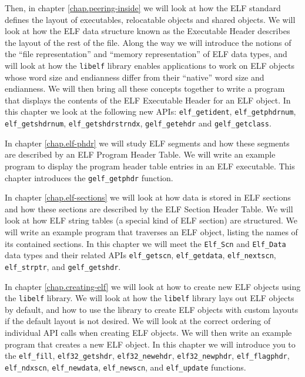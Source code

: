 \documentclass[a4paper,pdftex]{book}
\newcommand{\function}[1]{\texttt{#1}}
\newcommand{\library}[1]{\texttt{#1}}
\newcommand{\type}[1]{\texttt{#1}}
\begin{document}
Then, in chapter \vref{chap.peering-inside} we will look at how the
ELF standard defines the layout of executables, relocatable objects
and shared objects. We will look at how the ELF data structure known
as the Executable Header describes the layout
of the rest of the file.  Along the way we will introduce the notions
of the ``file representation'' and ``memory representation'' of ELF
data types, and will look at how the \library{libelf} library enables
applications to work on ELF objects whose word size and endianness
differ from their ``native'' word size and endianness. We will then
bring all these concepts together to write a program that displays the
contents of the ELF Executable Header for an ELF object. In this
chapter we look at the following new APIs: \function{elf\_getident},
\function{elf\_getphdrnum}, \function{elf\_getshdrnum},
\function{elf\_getshdrstrndx}, \function{gelf\_getehdr} and
\function{gelf\_getclass}.

In chapter \vref{chap.elf-phdr} we will study ELF segments and how
these segments are described by an ELF Prog\-ram Head\-er Table. We
will write an example program to display the program header table
entries in an ELF executable.  This chapter introduces the
\function{gelf\_getphdr} function.

In chapter \vref{chap.elf-sections} we will look at how data is stored
in ELF sections and how these sections are described by the ELF
Section Header Table. We will look at how ELF string tables (a special
kind of ELF section) are structured. We will write an example program
that traverses an ELF object, listing the names of its contained
sections.  In this chapter we will meet the \type{Elf\_Scn} and
\type{Elf\_Data} data types and their related APIs
\function{elf\_\-getscn}, \function{elf\_\-getdata},
\function{elf\_\-nextscn}, \function{elf\_\-strptr}, and
\function{gelf\_\-getshdr}.

In chapter \vref{chap.creating-elf} we will look at how to create new
ELF objects using the \library{libelf} library. We will look at how
the \library{libelf} library lays out ELF objects by default, and how
to use the library to create ELF objects with custom layouts if the
default layout is not desired. We will look at the correct ordering of
individual API calls when creating ELF objects. We will then write an
example program that creates a new ELF object.  In this chapter we
will introduce you to the \function{elf\_fill},
\function{elf32\_get\-shdr}, \function{elf32\_new\-ehdr},
\function{elf32\_new\-phdr}, \function{elf\_flag\-phdr},
\function{elf\_ndx\-scn}, \function{elf\_new\-data},
\function{elf\_new\-scn}, and \function{elf\_update} functions.
\end{document}
